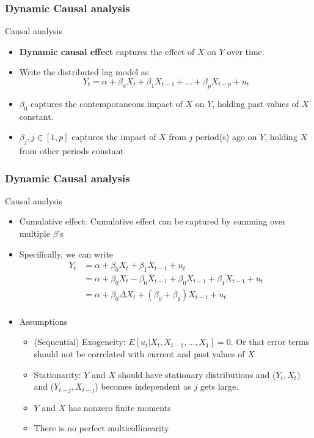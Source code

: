 \documentclass[compress]{beamer}
\begin{document}
\begin{frame}
\frametitle{Dynamic Causal analysis}
Causal analysis
\begin{itemize}
\item \textbf{Dynamic causal effect} captures the effect of $X$ on $Y$ over time.
\item Write the distributed lag model as 
\[
Y_t = \alpha+\beta_0X_t + \beta_1X_{t-1}+...+\beta_pX_{t-p}+u_t
\]
\item $\beta_0$ captures the contemporaneous impact of $X$ on $Y$, holding past values of $X$ constant. 
\item $\beta_j , j\in[1,p]$ captures the impact of $X$ from $j$ period(s) ago on $Y$, holding $X$ from other periods constant
\end{itemize}
\end{frame}

\begin{frame}
\frametitle{Dynamic Causal analysis}
Causal analysis
\begin{itemize}
\item Cumulative effect: Cumulative effect can be captured by summing over multiple $\beta$'s
\item Specifically, we can write
\[
\begin{aligned}
Y_t& = \alpha+\beta_0X_t + \beta_1X_{t-1}+u_t\\
&=\alpha +\beta_0 X_t - \beta_0X_{t-1} + \beta_0 X_{t-1} + \beta_1 X_{t-1}+u_t \\
&=\alpha + \beta_0\Delta X_t + (\beta_0 + \beta_1)X_{t-1}+u_t\\
\end{aligned}
\]
\item Assumptions
\begin{itemize}
\item (Sequential) Exogeneity: $E[u_t|X_t, X_{t-1},...,X_1]=0$. Or that error terms should not be correlated with current and past values of $X$
\item Stationarity: $Y$ and $X$ should have stationary distributions and ($Y_t, X_t$) and ($Y_{t-j}, X_{t-j}$) becomes independent as $j$ gets large. 
\item $Y$ and $X$ has nonzero finite moments
\item There is no perfect multicollinearity
\end{itemize}
\end{itemize}
\end{frame}
\end{document}
